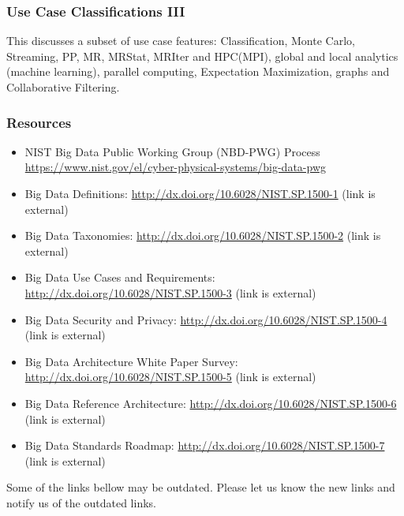 \subsubsection{Use Case Classifications
III}\label{use-case-classifications-iii}

This discusses a subset of use case features: Classification, Monte
Carlo, Streaming, PP, MR, MRStat, MRIter and HPC(MPI), global and local
analytics (machine learning), parallel computing, Expectation
Maximization, graphs and Collaborative Filtering.





\subsubsection{Resources}\label{resources}

\begin{itemize}
\item
  NIST Big Data Public Working Group (NBD-PWG) Process
  \url{https://www.nist.gov/el/cyber-physical-systems/big-data-pwg}
\item
  Big Data Definitions: \url{http://dx.doi.org/10.6028/NIST.SP.1500-1}
  (link is external)
\item
  Big Data Taxonomies: \url{http://dx.doi.org/10.6028/NIST.SP.1500-2}
  (link is external)
\item
  Big Data Use Cases and Requirements:
  \url{http://dx.doi.org/10.6028/NIST.SP.1500-3} (link is external)
\item
  Big Data Security and Privacy:
  \url{http://dx.doi.org/10.6028/NIST.SP.1500-4} (link is external)
\item
  Big Data Architecture White Paper Survey:
  \url{http://dx.doi.org/10.6028/NIST.SP.1500-5} (link is external)
\item
  Big Data Reference Architecture:
  \url{http://dx.doi.org/10.6028/NIST.SP.1500-6} (link is external)
\item
  Big Data Standards Roadmap:
  \url{http://dx.doi.org/10.6028/NIST.SP.1500-7} (link is external)
\end{itemize}

Some of the links bellow may be outdated. Please let us know the new
links and notify us of the outdated links.




